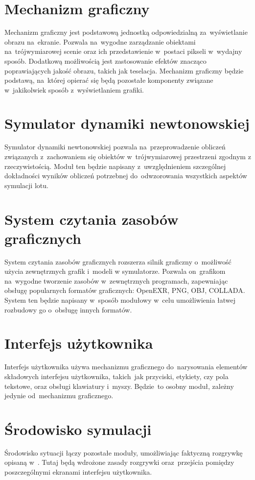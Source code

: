 \documentclass{mwrep}
\begin{document}
\section{Mechanizm graficzny}
Mechanizm graficzny jest podstawową jednostką odpowiedzialną za~wyświetlanie obrazu na~ekranie. Pozwala na~wygodne zarządzanie obiektami na~trójwymiarowej scenie oraz ich przedstawienie w~postaci pikseli w~wydajny sposób. Dodatkową możliwością jest zastosowanie efektów znacząco poprawiających jakość obrazu, takich jak teselacja\footnotemark[1]{}. Mechanizm graficzny będzie podstawą, na~której opierać się będą pozostałe komponenty związane w~jakikolwiek sposób z~wyświetlaniem grafiki.


\section{Symulator dynamiki newtonowskiej}
Symulator dynamiki newtonowskiej pozwala na~przeprowadzenie obliczeń związanych z~zachowaniem się obiektów w~trójwymiarowej przestrzeni zgodnym z rzeczywistością. Moduł ten będzie napisany z~uwzględnieniem szczególnej dokładności wyników obliczeń potrzebnej do~odwzorowania wszystkich aspektów symulacji lotu.

\section{System czytania zasobów graficznych}
System czytania zasobów graficznych rozszerza silnik graficzny o~możliwość użycia zewnętrznych grafik i~modeli w symulatorze. Pozwala on~grafikom na~wygodne tworzenie zasobów w~zewnętrznych programach, zapewniając obsługę popularnych formatów graficznych: OpenEXR, PNG, OBJ, COLLADA. System ten będzie napisany w~sposób modułowy w~celu umożliwienia łatwej rozbudowy go o~obsługę innych formatów.

\section{Interfejs użytkownika}
Interfejs użytkownika używa mechanizmu graficznego do~narysowania elementów składowych interfejsu użytkownika, takich~jak przyciski, etykiety, czy pola tekstowe, oraz obsługi klawiatury i~myszy. Będzie~to osobny moduł, zależny jedynie od~mechanizmu graficznego.

\section{Środowisko symulacji}
Środowisko sytuacji łączy pozostałe moduły, umożliwiając faktyczną rozgrywkę opisaną w~\cite{zalozenia}. Tutaj będą wdrożone zasady rozgrywki oraz~przejścia pomiędzy poszczególnymi ekranami interfejsu użytkownika.
\end{document}
